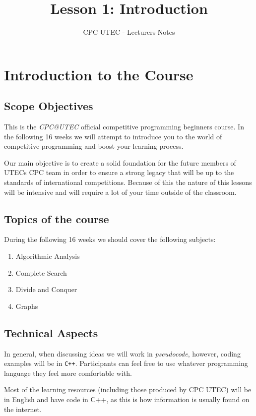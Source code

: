 \documentclass{article}
\title{Lesson 1: Introduction}
\author{CPC UTEC - Lecturers Notes}
\begin{document}
\maketitle

\section{Introduction to the Course}

\subsection{Scope Objectives}

This is the \textit{CPC@UTEC} official competitive programming beginners course. In the following 16 weeks we will attempt to introduce you to the world of competitive programming and boost your learning process.

Our main objective is to create a solid foundation for the future members of UTECs CPC team in order to ensure a strong legacy that will be up to the standards of international competitions. Because of this the nature of this lessons will be intensive and will require a lot of your time outside of the classroom.


\subsection{Topics of the course}

During the following 16 weeks we should cover the following subjects:

\begin{enumerate}
	\item Algorithmic Analysis
	\item Complete Search
	\item Divide and Conquer
	\item Graphs
\end{enumerate}

\subsection{Technical Aspects}

In general, when discussing ideas we will work in \textit{pseudocode}, however, coding examples will be in \texttt{C++}. Participants can feel free to use whatever programming language they feel more comfortable with.

Most of the learning resources (including those produced by CPC UTEC) will be in English and have code in C++, as this is how information is usually found on the internet.
\end{document}
